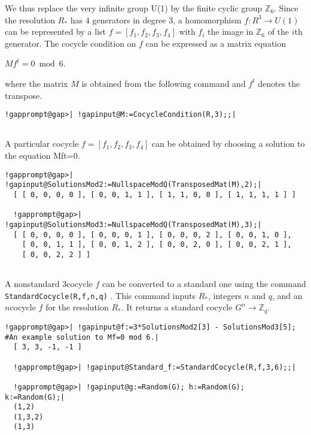 \documentclass[a4paper,11pt]{report}
\begin{document}
{{\begin{Verbatim}[commandchars=@|A,fontsize=\small,frame=single,label=Example]
\end{Verbatim}
 

 We thus replace the very infinite group U(1) by the finite cyclic group $\mathbb Z_6$. Since the resolution $R_\ast $ has $4$ generators in degree $3$, a homomorphism $f\colon R^3\rightarrow U(1)$ can be represented by a list $f=[f_1, f_2, f_3, f_4]$ with $f_i$ the image in $\mathbb Z_6$ of the $i$th generator. The cocycle condition on $f$ can be expressed as a matrix equation 

$Mf^t = 0 \bmod 6$. 

 where the matrix $M$ is obtained from the following command and $f^t$ denotes the transpose. 
\begin{Verbatim}[commandchars=!@|,fontsize=\small,frame=single,label=Example]
  !gapprompt@gap>| !gapinput@M:=CocycleCondition(R,3);;|
  
\end{Verbatim}
 A particular cocycle $f=[f_1, f_2, f_3, f_4]$ can be obtained by choosing a solution to the equation
Mf\texttt{}t=0. 
\begin{Verbatim}[commandchars=!@|,fontsize=\small,frame=single,label=Example]
  !gapprompt@gap>| !gapinput@SolutionsMod2:=NullspaceModQ(TransposedMat(M),2);|
  [ [ 0, 0, 0, 0 ], [ 0, 0, 1, 1 ], [ 1, 1, 0, 0 ], [ 1, 1, 1, 1 ] ]
  
  !gapprompt@gap>| !gapinput@SolutionsMod3:=NullspaceModQ(TransposedMat(M),3);|
  [ [ 0, 0, 0, 0 ], [ 0, 0, 0, 1 ], [ 0, 0, 0, 2 ], [ 0, 0, 1, 0 ],
    [ 0, 0, 1, 1 ], [ 0, 0, 1, 2 ], [ 0, 0, 2, 0 ], [ 0, 0, 2, 1 ],
    [ 0, 0, 2, 2 ] ]
  
\end{Verbatim}
 A non\texttt{}standard $3$\texttt{}cocycle $f$ can be converted to a standard one using the command \texttt{StandardCocycle(R,f,n,q)} . This command inputs $ R_\ast$, integers $n$ and $q$, and an $n$\texttt{}cocycle $f$ for the resolution $R_\ast$. It returns a standard cocycle $G^n \rightarrow \mathbb Z_q$. 
\begin{Verbatim}[commandchars=!@|,fontsize=\small,frame=single,label=Example]
  !gapprompt@gap>| !gapinput@f:=3*SolutionsMod2[3] - SolutionsMod3[5];   #An example solution to Mf=0 mod 6.|
  [ 3, 3, -1, -1 ]
  
  !gapprompt@gap>| !gapinput@Standard_f:=StandardCocycle(R,f,3,6);;|
  
  !gapprompt@gap>| !gapinput@g:=Random(G); h:=Random(G); k:=Random(G);|
  (1,2)
  (1,3,2)
  (1,3)
  

\end{Verbatim}}}
\end{document}
